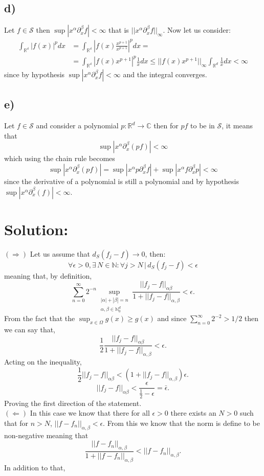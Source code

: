 \documentclass{article}
\begin{document}
\subsection*{d)}
Let $f \in \mathcal{S}$ then $\sup |x^\alpha {\partial^\beta_x f}|<\infty$ that is $||x^\alpha {\partial^\beta_x f}||_\infty$. Now let us consider:
\[
    \begin{split}
        \int_{\mathbb{R^d}} |f(x)|^p dx &= \int_{\mathbb{R^d}} |f(x) \frac{x^{p+1}}{x^{p+1}}|^p dx = \\
        &= \int_{\mathbb{R^d}} |f(x) x^{p+1}|^p \frac{1}{x}dx \leq || f(x) x^{p+1} ||_{\infty} \int_{\mathbb{R}^d} \frac{1}{x}dx < \infty
    \end{split}
\]
since by hypothesis $\sup |x^\alpha {\partial^\beta_x f}|<\infty$ and the integral converges.
\subsection*{e)}
Let $f \in \mathcal{S}$ and consider a polynomial $p: \mathbb{R}^d \to \mathbb{C}$ then for $pf$ to be in $\mathcal{S}$, it means that
\[
    \sup|x^\alpha \partial_x^\beta (pf)|<\infty
\]
which using the chain rule becomes
\[
    \sup|x^\alpha \partial_x^\beta (pf)| = \sup|x^\alpha p \partial_x^\beta f| +\sup|x^\alpha f \partial_x^\beta p|<\infty
\]
since the derivative of a polynomial is still a polynomial and by hypothesis $\sup|x^\alpha \partial_x^\beta (f)|<\infty$.
\section{Solution:}
$(\Rightarrow)$ Let us assume that $d_S (f_j -f) \rightarrow 0$, then:
\[
    \forall \epsilon >0, \exists\, N \in \mathbb N : \forall j>N \, | \, d_S(f_j -f) < \epsilon
\]
meaning that, by definition,
\[
    \sum_{n=0}^\infty 2^{-n} \sup_{\substack{|\alpha|+|\beta| = n \\ \alpha, \beta \in \mathbb N_0^d}} \frac{|| f_j - f||_{\alpha\beta}}{1+||f_j - f||_{\alpha, \beta}} < \epsilon.
\]
From the fact that the $\sup_{x \in \Omega} g(x) \geq g(x)$ and since $\sum_{n=0}^\infty 2^{-2} > 1/2$ then we can say that,
\[
    \frac{1}{2} \frac{|| f_j - f||_{\alpha\beta}}{1+||f_j - f||_{\alpha, \beta}} < \epsilon.
\]
Acting on the inequality,
\[
    \frac{1}{2}|| f_j - f||_{\alpha\beta} < (1+||f_j - f||_{\alpha, \beta}) \epsilon.
\]
\[
    || f_j - f||_{\alpha\beta} < \frac{\epsilon}{\frac{1}{2}-\epsilon} = \bar{\epsilon}.
\]
Proving the first direction of the statement.\\
$(\Leftarrow)$
In this case we know that there for all $\epsilon>0$ there exists an $N>0$ such that for $n>N$, $||f - f_n||_{\alpha,\beta}<\epsilon$. From this we know that the norm is define to be non-negative meaning that
\[
    \frac{||f - f_n||_{\alpha,\beta}}{1 + ||f - f_n||_{\alpha,\beta}} < ||f - f_n||_{\alpha,\beta}.
\]
In addition to that,
\end{document}
